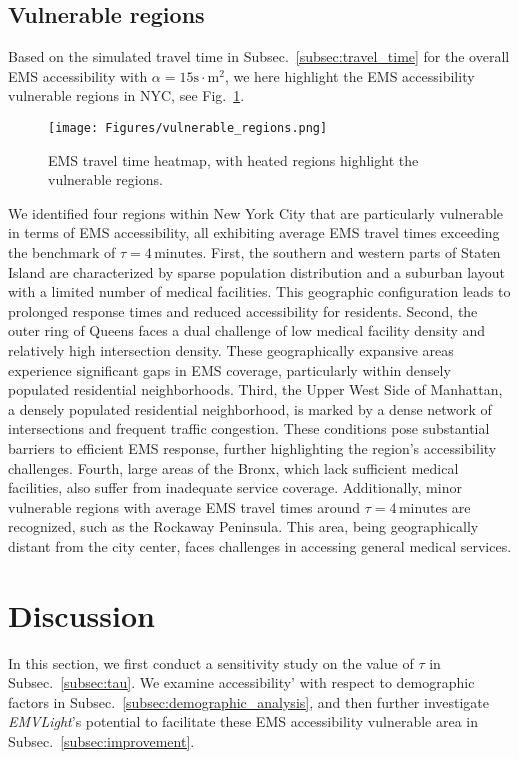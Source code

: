 \subsection{Vulnerable regions}\label{subsec:vulnerable_regions}
Based on the simulated travel time in Subsec.~\ref{subsec:travel_time} for the overall EMS accessibility with $\alpha = 15\text{s}\cdot\text{m}^2$, we here highlight the EMS accessibility vulnerable regions in NYC, see Fig.~\ref{fig:vulnerable_regions}.
\begin{figure}[h]
    \centering
    \texttt{[image: Figures/vulnerable\_regions.png]} 
    \caption{EMS travel time heatmap, with heated regions highlight the vulnerable regions.}
    \label{fig:vulnerable_regions}
\end{figure}

We identified four regions within New York City that are particularly vulnerable in terms of EMS accessibility, all exhibiting average EMS travel times exceeding the benchmark of $\tau = 4 \, \text{minutes}$. First, the southern and western parts of Staten Island are characterized by sparse population distribution and a suburban layout with a limited number of medical facilities. This geographic configuration leads to prolonged response times and reduced accessibility for residents. Second, the outer ring of Queens faces a dual challenge of low medical facility density and relatively high intersection density. These geographically expansive areas experience significant gaps in EMS coverage, particularly within densely populated residential neighborhoods. Third, the Upper West Side of Manhattan, a densely populated residential neighborhood, is marked by a dense network of intersections and frequent traffic congestion. These conditions pose substantial barriers to efficient EMS response, further highlighting the region's accessibility challenges. Fourth, large areas of the Bronx, which lack sufficient medical facilities, also suffer from inadequate service coverage. Additionally, minor vulnerable regions with average EMS travel times around $\tau = 4 \, \text{minutes}$ are recognized, such as the Rockaway Peninsula. This area, being geographically distant from the city center, faces challenges in accessing general medical services.
\section{Discussion}
\label{sec:discussion_access}
In this section, we first conduct a sensitivity study on the value of $\tau$ in Subsec.~\ref{subsec:tau}. We examine accessibility' with respect to demographic factors in Subsec.~\ref{subsec:demographic_analysis}, and then further investigate \textit{EMVLight}'s potential to facilitate these EMS accessibility vulnerable area in Subsec.~\ref{subsec:improvement}.

